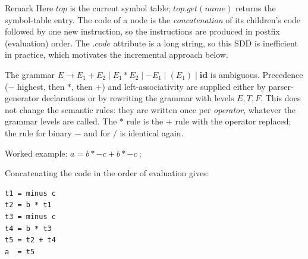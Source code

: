 \documentclass[11pt,a4paper]{article}
\newcommand{\at}[2]{\ensuremath{#1.\mathit{#2}}}
\begin{document}
\begin{notebox}{Remark}
Here $\mathit{top}$ is the current symbol table; $\mathit{top}.\mathit{get}(\textit{name})$ returns the symbol-table entry. The code of a node is the \emph{concatenation} of its children's code followed by one new instruction, so the instructions are produced in postfix (evaluation) order. The $\at{}{code}$ attribute is a long string, so this SDD is inefficient in practice, which motivates the incremental approach below.
\end{notebox}

The grammar $E\to E_1+E_2\mid E_1*E_2\mid-E_1\mid(E_1)\mid\mathbf{id}$ is ambiguous. Precedence ($-$ highest, then $*$, then $+$) and left-associativity are supplied either by parser-generator declarations or by rewriting the grammar with levels $E, T, F$. This does not change the semantic rules: they are written once per \emph{operator}, whatever the grammar levels are called. The $*$ rule is the $+$ rule with the operator replaced; the rule for binary $-$ and for $/$ is identical again.

\begin{examplebox}{Worked example: $a = b * -c + b * -c\ ;$}
\begin{center}
\end{center}
Concatenating the code in the order of evaluation gives:
\begin{lstlisting}
t1 = minus c
t2 = b * t1
t3 = minus c
t4 = b * t3
t5 = t2 + t4
a  = t5
\end{lstlisting}
\end{examplebox}
\end{document}
